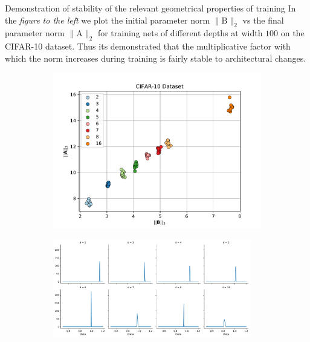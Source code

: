 \documentclass[final,t]{beamer}
\newcommand{\norm}[2][]{#1\lVert #2 #1\rVert}
\newcommand{\A}{\textrm{A}}
\newcommand{\B}{\textrm{B}}
\begin{document}
\begin{frame}[containsverbatim]
\begin{columns}[t]
\begin{column}{.32\linewidth}
\begin{exampleblock}{Demonstration of stability of the relevant geometrical properties of training}
\vspace{2.2mm}
In the {\it \color{violet} figure to the left} we plot the initial parameter norm $\norm{\B}_2$ vs the final parameter norm $\norm{\A}_2$ for training nets of different depths at width $100$ on the CIFAR-10 dataset. Thus its demonstrated that the multiplicative factor with which the norm increases during training is fairly stable to architectural changes. 

\begin{figure}[htbp]
  \begin{subfigure}[b]{.45\textwidth}
    \centering
  \includegraphics[width=\textwidth]{dcifstorel2norm.pdf}
  \end{subfigure}
  \hfill 
  \hspace{-10mm} 
  \begin{subfigure}[b]{.45\textwidth}
    \centering
  \includegraphics[width=0.95\textwidth]{dcif_kdetheta.pdf}

\end{subfigure}
\end{figure}
\end{exampleblock}
\end{column}
\end{columns}
\end{frame}
\end{document}
